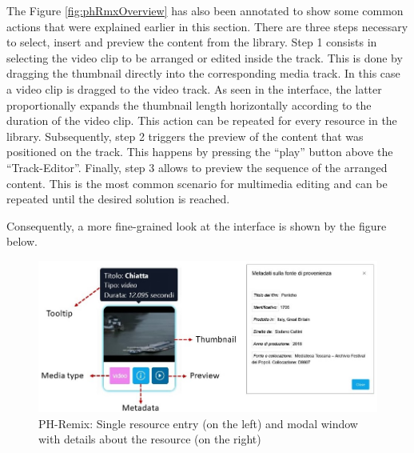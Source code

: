 The Figure \ref{fig:phRmxOverview} has also been annotated to show some common actions that were explained earlier in this section. There are three steps necessary to select, insert and preview the content from the library. Step 1 consists in selecting the video clip to be arranged or edited inside the track. This is done by dragging the thumbnail directly into the corresponding media track. In this case a video clip is dragged to the video track. As seen in the interface, the latter proportionally expands the thumbnail length horizontally according to the duration of the video clip. This action can be repeated for every resource in the library. Subsequently, step 2 triggers the preview of the content that was positioned on the track. This happens by pressing the “play” button above the “Track-Editor”. Finally, step 3 allows to preview the sequence of the arranged content. This is the most common scenario for multimedia editing and can be repeated until the desired solution is reached.

Consequently, a more fine-grained look at the interface is shown by the figure below.

\begin{figure}[H]
\centering
\includegraphics[width=1\textwidth]{images/phrDetails.jpg}
\caption{PH-Remix: Single resource entry (on the left) and modal window with details about the resource (on the right)}
\label{fig:phRmxDetails}
\end{figure}

